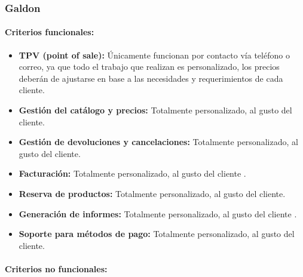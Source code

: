\documentclass{article}
\begin{document}
\subsubsection{Galdon}

\paragraph{Criterios funcionales:}

\begin{itemize}

	\item \textbf{TPV (point of sale):} Únicamente funcionan por contacto vía teléfono o correo, ya que todo el trabajo que realizan es personalizado, los precios deberán de ajustarse en base a las necesidades y requerimientos de cada cliente.  
	\item \textbf{Gestión del catálogo y precios:}  Totalmente personalizado, al gusto del cliente.
	\item \textbf{Gestión de devoluciones y cancelaciones:}  Totalmente personalizado, al gusto del cliente.
	\item \textbf{Facturación:}  Totalmente personalizado, al gusto del cliente . 
	\item \textbf{Reserva de productos:} Totalmente personalizado, al gusto del cliente.
	\item \textbf{Generación de informes:}  Totalmente personalizado, al gusto del cliente .
	\item \textbf{Soporte para métodos de pago:}  Totalmente personalizado, al gusto del cliente.

\end{itemize}

\paragraph{Criterios no funcionales:}
\end{document}
